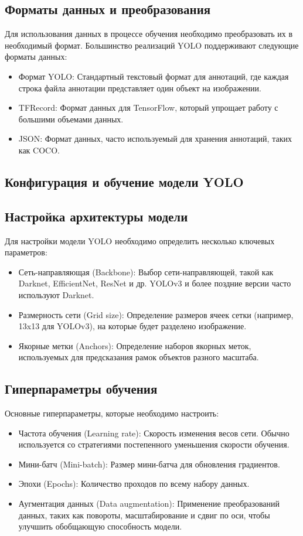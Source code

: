     \subsection{Форматы данных и преобразования}
    Для использования данных в процессе обучения необходимо преобразовать их в необходимый формат. Большинство реализаций YOLO поддерживают следующие форматы данных:
    \begin{itemize}
        \item Формат YOLO: Стандартный текстовый формат для аннотаций, где каждая строка файла аннотации представляет один объект на изображении.
        \item TFRecord: Формат данных для TensorFlow, который упрощает работу с большими объемами данных.
        \item JSON: Формат данных, часто используемый для хранения аннотаций, таких как COCO.
    \end{itemize}

    \subsection{Конфигурация и обучение модели YOLO}

    \subsection{Настройка архитектуры модели}
    Для настройки модели YOLO необходимо определить несколько ключевых параметров:
    \begin{itemize}
        \item Сеть-направляющая (Backbone): Выбор сети-направляющей, такой как Darknet, EfficientNet, ResNet и др. YOLOv3 и более поздние версии часто используют Darknet.
        \item Размерность сети (Grid size): Определение размеров ячеек сетки (например, 13x13 для YOLOv3), на которые будет разделено изображение.
        \item Якорные метки (Anchors): Определение наборов якорных меток, используемых для предсказания рамок объектов разного масштаба.
    \end{itemize}

    \subsection{Гиперпараметры обучения}
    Основные гиперпараметры, которые необходимо настроить:
    \begin{itemize}
        \item Частота обучения (Learning rate): Скорость изменения весов сети. Обычно используется со стратегиями постепенного уменьшения скорости обучения.
        \item Мини-батч (Mini-batch): Размер мини-батча для обновления градиентов.
        \item Эпохи (Epochs): Количество проходов по всему набору данных.
        \item Аугментация данных (Data augmentation): Применение преобразований данных, таких как повороты, масштабирование и сдвиг по оси, чтобы улучшить обобщающую способность модели.
    \end{itemize}

